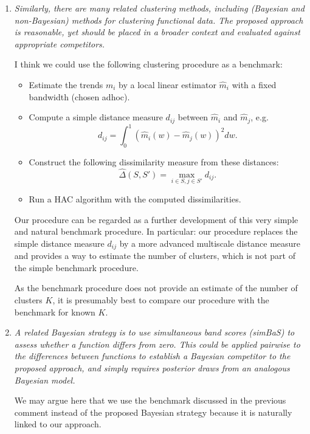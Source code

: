 \documentclass[a4paper,12pt]{article}
\begin{document}
\begin{enumerate}[label=\arabic*.,leftmargin=0.6cm]
{\begin{itemize}[topsep=0pt]
\end{itemize}
}


\item \textit{Similarly, there are many related clustering methods, including (Bayesian and non-Bayesian) methods for clustering functional data. The proposed approach is reasonable, yet should be placed in a broader context and evaluated against appropriate competitors.}

{\color{blue}  
I think we could use the following clustering procedure as a benchmark:
\begin{itemize}[label=--,leftmargin=0.45cm,itemsep=0pt,topsep=0pt]
\item Estimate the trends $m_i$ by a local linear estimator $\hat{m}_i$ with a fixed bandwidth (chosen adhoc).
\item Compute a simple distance measure $d_{ij}$ between $\hat{m}_i$ and $\hat{m}_j$, e.g.
\[ d_{ij} = \int_0^1 (\hat{m}_i(w) - \hat{m}_j(w))^2 dw. \]
\item Construct the following dissimilarity measure from these distances:
\[ \hat{\Delta}(S,S') = \max_{i \in S,j \in S'} d_{ij}. \]
\item Run a HAC algorithm with the computed dissimilarities. 
\end{itemize}

Our procedure can be regarded as a further development of this very simple and natural benchmark procedure. In particular: our procedure replaces the simple distance measure $d_{ij}$ by a more advanced multiscale distance measure and provides a way to estimate the number of clusters, which is not part of the simple benchmark procedure.

As the benchmark procedure does not provide an estimate of the number of clusters $K$, it is presumably best to compare our procedure with the benchmark for known $K$. 

}
  

\item \textit{A related Bayesian strategy is to use simultaneous band scores (simBaS) to assess whether a function differs from zero. This could be applied pairwise to the differences between functions to establish a Bayesian competitor to the proposed approach, and simply requires posterior draws from an analogous Bayesian model.}

{\color{blue}  
We may argue here that we use the benchmark discussed in the previous comment instead of the proposed Bayesian strategy because it is naturally linked to our approach. 
}


\end{enumerate}
\end{document}
